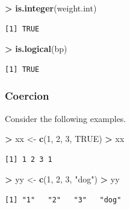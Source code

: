 \documentclass[]{krantz}
\makeatletter
\newenvironment{Shaded}{\begin{snugshade}}{\end{snugshade}}
\newcommand{\DecValTok}[1]{\textcolor[rgb]{0.06,0.06,0.06}{#1}}
\newcommand{\KeywordTok}[1]{\textcolor[rgb]{0.27,0.27,0.27}{\textbf{#1}}}
\newcommand{\NormalTok}[1]{#1}
\newcommand{\OperatorTok}[1]{\textcolor[rgb]{0.43,0.43,0.43}{\textbf{#1}}}
\newcommand{\OtherTok}[1]{\textcolor[rgb]{0.37,0.37,0.37}{#1}}
\newcommand{\StringTok}[1]{\textcolor[rgb]{0.5,0.5,0.5}{#1}}
\newenvironment{kframe}{%
\medskip{}
\setlength{\fboxsep}{.8em}
 \def\at@end@of@kframe{}%
 \ifinner\ifhmode%
  \def\at@end@of@kframe{\end{minipage}}%
  \begin{minipage}{\columnwidth}%
 \fi\fi%
 \def\FrameCommand##1{\hskip\@totalleftmargin \hskip-\fboxsep
 \colorbox{shadecolor}{##1}\hskip-\fboxsep
     \hskip-\linewidth \hskip-\@totalleftmargin \hskip\columnwidth}%
 \MakeFramed {\advance\hsize-\width
   \@totalleftmargin\z@ \linewidth\hsize
   \@setminipage}}%
 {\par\unskip\endMakeFramed%
 \at@end@of@kframe}
\renewenvironment{Shaded}{\begin{kframe}}{\end{kframe}}
\makeatother
\begin{document}
\begin{Shaded}
\begin{Highlighting}[]
\OperatorTok{>}\StringTok{ }\KeywordTok{is.integer}\NormalTok{(weight.int)}
\end{Highlighting}
\end{Shaded}

\begin{verbatim}
[1] TRUE
\end{verbatim}

\begin{Shaded}
\begin{Highlighting}[]
\OperatorTok{>}\StringTok{ }\KeywordTok{is.logical}\NormalTok{(bp)}
\end{Highlighting}
\end{Shaded}

\begin{verbatim}
[1] TRUE
\end{verbatim}

\hypertarget{coercion}{%
\subsubsection{Coercion}\label{coercion}}

Consider the following examples.

\begin{Shaded}
\begin{Highlighting}[]
\OperatorTok{>}\StringTok{ }\NormalTok{xx <-}\StringTok{ }\KeywordTok{c}\NormalTok{(}\DecValTok{1}\NormalTok{, }\DecValTok{2}\NormalTok{, }\DecValTok{3}\NormalTok{, }\OtherTok{TRUE}\NormalTok{)}
\OperatorTok{>}\StringTok{ }\NormalTok{xx}
\end{Highlighting}
\end{Shaded}

\begin{verbatim}
[1] 1 2 3 1
\end{verbatim}

\begin{Shaded}
\begin{Highlighting}[]
\OperatorTok{>}\StringTok{ }\NormalTok{yy <-}\StringTok{ }\KeywordTok{c}\NormalTok{(}\DecValTok{1}\NormalTok{, }\DecValTok{2}\NormalTok{, }\DecValTok{3}\NormalTok{, }\StringTok{"dog"}\NormalTok{)}
\OperatorTok{>}\StringTok{ }\NormalTok{yy}
\end{Highlighting}
\end{Shaded}

\begin{verbatim}
[1] "1"   "2"   "3"   "dog"
\end{verbatim}
\end{document}
